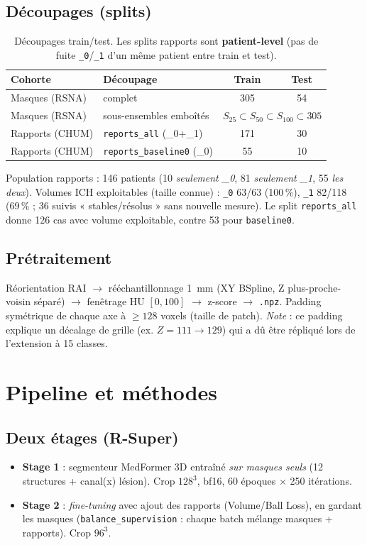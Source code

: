 \documentclass[11pt,a4paper]{article}
\begin{document}
\subsection{Découpages (splits)}
\label{sec:splits}
\begin{table}[h]\centering
\caption{Découpages train/test. Les splits rapports sont \textbf{patient-level}
(pas de fuite \texttt{\_0}/\texttt{\_1} d'un même patient entre train et test).}
\label{tab:splits}
\begin{tabular}{llcc}
\toprule
Cohorte & Découpage & Train & Test \\
\midrule
Masques (RSNA) & complet & 305 & 54 \\
Masques (RSNA) & sous-ensembles emboîtés & \multicolumn{2}{c}{$S_{25}\subset S_{50}\subset S_{100}\subset 305$} \\
\midrule
Rapports (CHUM) & \texttt{reports\_all} (\_0+\_1) & 171 & 30 \\
Rapports (CHUM) & \texttt{reports\_baseline0} (\_0) & 55 & 10 \\
\bottomrule
\end{tabular}
\end{table}

\noindent Population rapports : 146 patients (10 \emph{seulement \_0}, 81 \emph{seulement \_1},
55 \emph{les deux}). Volumes ICH exploitables (taille connue) : \texttt{\_0} 63/63 (100\,\%),
\texttt{\_1} 82/118 (69\,\% ; 36 suivis « stables/résolus » sans nouvelle mesure). Le split
\texttt{reports\_all} donne 126 cas avec volume exploitable, contre 53 pour \texttt{baseline0}.

\subsection{Prétraitement}
Réorientation RAI $\rightarrow$ rééchantillonnage 1~mm (XY BSpline, Z plus-proche-voisin
séparé) $\rightarrow$ fenêtrage HU $[0,100]$ $\rightarrow$ z-score $\rightarrow$ \texttt{.npz}.
Padding symétrique de chaque axe à $\geq 128$ voxels (taille de patch). \emph{Note} : ce
padding explique un décalage de grille (ex. $Z{=}111 \rightarrow 129$) qui a dû être répliqué
lors de l'extension à 15 classes.

\section{Pipeline et méthodes}
\subsection{Deux étages (R-Super)}
\begin{itemize}[nosep]
  \item \textbf{Stage 1} : segmenteur MedFormer 3D entraîné \emph{sur masques seuls}
  (12 structures + canal(x) lésion). Crop $128^3$, bf16, 60 époques $\times$ 250 itérations.
  \item \textbf{Stage 2} : \emph{fine-tuning} avec ajout des rapports (Volume/Ball Loss),
  en gardant les masques (\texttt{balance\_supervision} : chaque batch mélange masques + rapports).
  Crop $96^3$.
\end{itemize}
\end{document}
